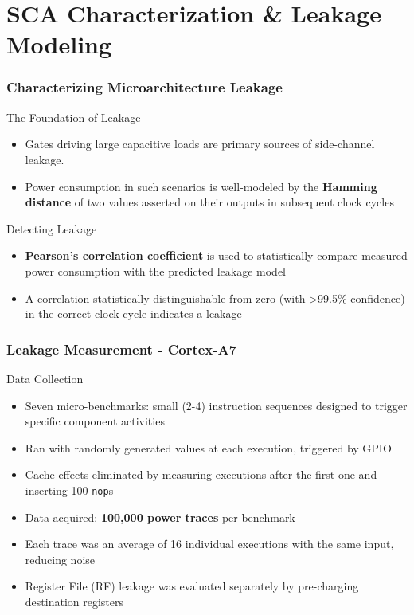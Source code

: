 \section{SCA Characterization \& Leakage Modeling} %

\begin{frame}
    \frametitle{Characterizing Microarchitecture Leakage}
    \begin{block}{The Foundation of Leakage}
        \begin{itemize}
            \item Gates driving large capacitive loads are primary sources of side-channel leakage.
            \item Power consumption in such scenarios is well-modeled by the \textbf{Hamming distance} of two values asserted on their outputs in subsequent clock cycles
        \end{itemize}   
    \end{block}

    \begin{block}{Detecting Leakage}
        \begin{itemize}
            \item \textbf{Pearson's correlation coefficient} is used to statistically compare measured power consumption with the predicted leakage model
            \item A correlation statistically distinguishable from zero (with >99.5\% confidence) in the correct clock cycle indicates a leakage
        \end{itemize}
    \end{block}
\end{frame}

\begin{frame}
    \frametitle{Leakage Measurement - Cortex-A7}
    \begin{block}{Data Collection}
        \begin{itemize}
            \item Seven micro-benchmarks: small (2-4) instruction sequences designed to trigger specific component activities
            \item Ran with randomly generated values at each execution, triggered by GPIO
            \item Cache effects eliminated by measuring executions after the first one and inserting 100 \texttt{nop}s
            \item Data acquired: \textbf{100,000 power traces} per benchmark
            \item Each trace was an average of 16 individual executions with the same input, reducing noise
            \item Register File (RF) leakage was evaluated separately by pre-charging destination registers
        \end{itemize}
    \end{block}
\end{frame}

